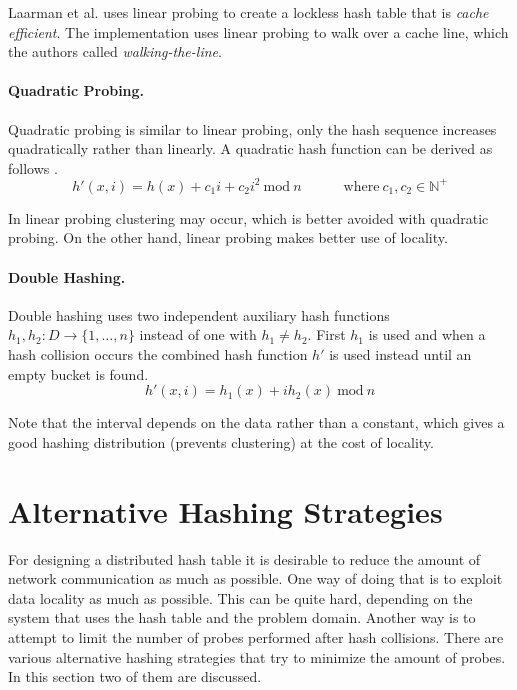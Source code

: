 Laarman et al. \cite{so73119} uses linear probing to create a lockless hash table that is \emph{cache efficient}. The implementation uses linear probing to walk over a cache line, which the authors called \emph{walking-the-line}.

\paragraph{Quadratic Probing.}
Quadratic probing is similar to linear probing, only the hash sequence increases quadratically rather than linearly. A quadratic hash function can be derived as follows \cite{Cormen:2009:IAT:1614191}.
\begin{equation}
	h'(x, i) = h(x) + c_1 i + c_2 i^2 \ \text{mod} \ n \hspace{36pt} \text{where} \ c_1, c_2 \in \mathbb{N}^+
\end{equation}

In linear probing clustering may occur, which is better avoided with quadratic probing. On the other hand, linear probing makes better use of locality. 

\paragraph{Double Hashing.}
Double hashing uses two independent auxiliary hash functions $h_1, h_2 : D \rightarrow \{ 1, \dots, n \}$ instead of one with $h_1 \not = h_2$. First $h_1$ is used and when a hash collision occurs the combined hash function $h'$ \cite{Cormen:2009:IAT:1614191} is used instead until an empty bucket is found.
\begin{equation}
	h'(x, i) = h_1(x) + ih_2(x) \ \text{mod} \ n
\end{equation}

Note that the interval depends on the data rather than a constant, which gives a good hashing distribution (prevents clustering) at the cost of locality.

\section{Alternative Hashing Strategies}
For designing a distributed hash table it is desirable to reduce the amount of network communication as much as possible. One way of doing that is to exploit data locality as much as possible. This can be quite hard, depending on the system that uses the hash table and the problem domain. Another way is to attempt to limit the number of probes performed after hash collisions. There are various alternative hashing strategies that try to minimize the amount of probes. In this section two of them are discussed.

